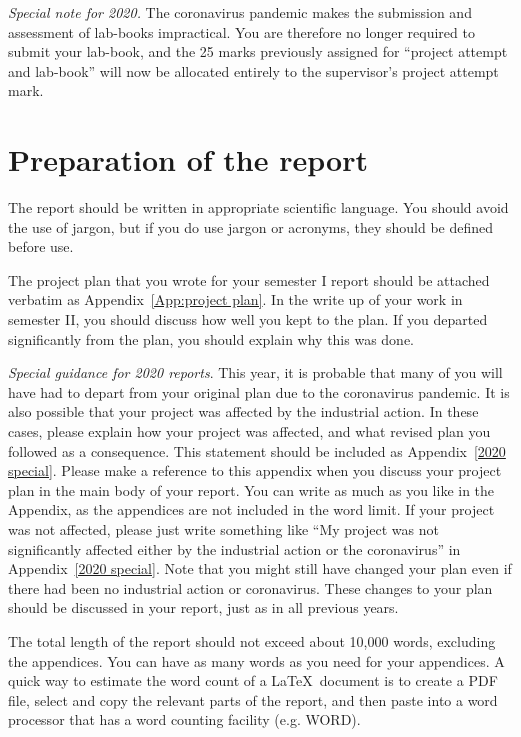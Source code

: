 \documentclass[a4paper,fleqn,usenatbib]{mnras}
\begin{document}
\textit{Special note for 2020.} The coronavirus pandemic makes the submission and assessment of lab-books impractical. You are therefore no longer required to submit your lab-book, and the 25 marks previously assigned for ``project attempt and lab-book'' will now be allocated entirely to the supervisor's project attempt mark.








\section{Preparation of the report}
The report should be written in appropriate scientific language. You should avoid the use of jargon, but if you do use jargon or acronyms, they should be defined before use.  

The project plan that you wrote for your semester I report should be attached verbatim as Appendix~\ref{App:project plan}. In the write up of your work in semester II, you should discuss how well you kept to the plan. If you departed significantly from the plan, you should explain why this was done.

\textit{Special guidance for 2020 reports}. This year, it is probable that many of you will have had to depart from your original plan due to the coronavirus pandemic. It is also possible that your project was affected by the industrial action. In these cases, please explain how your project was affected, and what revised plan you followed as a consequence. This statement should be included as Appendix~\ref{2020 special}. Please make a reference to this appendix when you discuss your project plan in the main body of your report. You can write as much as you like in the Appendix, as the appendices are not included in the word limit. 
If your project was not affected, please just write something like ``My project was not significantly affected either by the industrial action or the coronavirus'' in Appendix~\ref{2020 special}. Note that you might still have changed your plan even if there had been no industrial action or coronavirus. These changes to your plan should be discussed in your report, just as in all previous years.

 
The total length of the report should not exceed about 10,000 words, excluding the appendices. You can have as many words as you need for your appendices. A quick way to estimate the word count of a \LaTeX\ document is to create a PDF file, select and copy the relevant parts  of the report, and then paste into a word processor that has a word counting facility (e.g. WORD).
\end{document}
